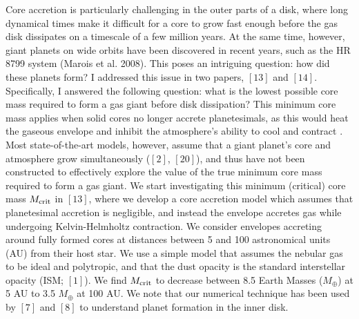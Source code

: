 \documentclass[12pt, letterpaper]{article}
\begin{document}
Core accretion is particularly challenging in the outer parts of a disk, where long dynamical times make it difficult for a core to grow fast enough before the gas disk dissipates on a timescale of a few million years. At the same time, however, giant planets on wide orbits have been discovered in recent years, such as the HR 8799 system (Marois et al. 2008). This poses an intriguing question: how did these planets form? I addressed this issue in two papers, $[13]$ and $[14]$. Specifically, I answered the following question: what is the lowest possible core mass required to form a gas giant before disk dissipation? This minimum core mass applies when  solid cores no longer accrete planetesimals, as this would heat the gaseous envelope and inhibit the atmosphere's ability to cool and contract . Most state-of-the-art models, however, assume that a giant planet's core and atmosphere grow simultaneously ($[2]$, $[20]$), and thus have not been constructed to effectively explore the value of the true minimum core mass required to form a gas giant. We start investigating this minimum (critical) core mass $M_{\rm crit}$ in $[13]$, where we develop a core accretion model which assumes that planetesimal accretion is negligible, and instead the envelope accretes gas while undergoing Kelvin-Helmholtz contraction. 
We consider envelopes accreting around fully formed cores at distances between 5 and 100 astronomical units (AU) from their host star. We use a simple model that assumes the nebular gas to be ideal and polytropic, and that the dust opacity is the standard interstellar opacity (ISM; $[1]$). We find $M_{\rm crit}$ to decrease between 8.5 Earth Masses ($M_{\oplus}$) at 5 AU to 3.5 $M_{\oplus}$ at 100 AU. 
We note that our numerical technique has been used by $[7]$ and $[8]$ to understand planet formation in the inner disk. 
\end{document}
